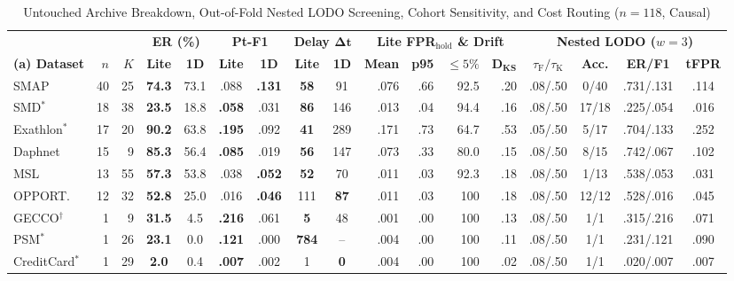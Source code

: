 \begin{table}[t]
\centering
\scriptsize
\setlength{\tabcolsep}{1.0pt}
\renewcommand{\arraystretch}{0.95}
\caption{Untouched Archive Breakdown, Out-of-Fold Nested LODO Screening, Cohort Sensitivity, and Cost Routing ($n{=}118$, Causal)\label{tab:dataset_lodo_audit}}
\begin{tabular*}{\textwidth}{@{\extracolsep{\fill}} l rr cc cc cc rrrr cccc @{}}
\toprule
& & & \multicolumn{2}{c}{\textbf{ER (\%)}} & \multicolumn{2}{c}{\textbf{Pt-F1}} & \multicolumn{2}{c}{\textbf{Delay $\boldsymbol{\Delta t}$}} & \multicolumn{4}{c}{\textbf{Lite FPR$_{\text{hold}}$ \& Drift}} & \multicolumn{4}{c}{\textbf{Nested LODO ($w{=}3$)}} \\
\cmidrule(lr){4-5} \cmidrule(lr){6-7} \cmidrule(lr){8-9} \cmidrule(lr){10-13} \cmidrule(lr){14-17}
\textbf{(a) Dataset} & {$n$} & {$K$} & {\textbf{Lite}} & {\textbf{1D}} & {\textbf{Lite}} & {\textbf{1D}} & {\textbf{Lite}} & {\textbf{1D}} & {\textbf{Mean}} & {\textbf{p95}} & {\textbf{${\le}5\%$}} & {$\boldsymbol{D_{\text{KS}}}$} & {\textbf{$\tau_{\text{F}}/\tau_{\text{K}}$}} & {\textbf{Acc.}} & {\textbf{ER/F1}} & {\textbf{tFPR}} \\
\midrule
SMAP             & 40 & 25 & \textbf{74.3} & 73.1 & .088 & \textbf{.131} & \textbf{58}  & 91  & .076 & .66 & 92.5 & .20 & .08/.50 & 0/40  & .731/.131 & .114 \\
SMD$^*$          & 18 & 38 & \textbf{23.5} & 18.8 & \textbf{.058} & .031 & \textbf{86}  & 146 & .013 & .04 & 94.4 & .16 & .08/.50 & 17/18 & .225/.054 & .016 \\
Exathlon$^*$     & 17 & 20 & \textbf{90.2} & 63.8 & \textbf{.195} & .092 & \textbf{41}  & 289 & .171 & .73 & 64.7 & .53 & .05/.50 & 5/17  & .704/.133 & .252 \\
Daphnet          & 15 & 9  & \textbf{85.3} & 56.4 & \textbf{.085} & .019 & \textbf{56}  & 147 & .073 & .33 & 80.0 & .15 & .08/.50 & 8/15  & .742/.067 & .102 \\
MSL              & 13 & 55 & \textbf{57.3} & 53.8 & .038 & \textbf{.052} & \textbf{52}  & 70  & .011 & .03 & 92.3 & .18 & .08/.50 & 1/13  & .538/.053 & .031 \\
OPPORT.          & 12 & 32 & \textbf{52.8} & 25.0 & .016 & \textbf{.046} & 111 & \textbf{87}  & .011 & .03 & 100  & .18 & .08/.50 & 12/12 & .528/.016 & .045 \\
GECCO$^\dagger$  & 1  & 9  & \textbf{31.5} & 4.5  & \textbf{.216} & .061 & \textbf{5}   & 48  & .001 & .00 & 100  & .13 & .08/.50 & 1/1   & .315/.216 & .071 \\
PSM$^*$          & 1  & 26 & \textbf{23.1} & 0.0  & \textbf{.121} & .000 & \textbf{784} & {--}& .004 & .00 & 100  & .11 & .08/.50 & 1/1   & .231/.121 & .090 \\
CreditCard$^*$   & 1  & 29 & \textbf{2.0}  & 0.4  & \textbf{.007} & .002 & 1   & \textbf{0}   & .004 & .00 & 100  & .02 & .08/.50 & 1/1   & .020/.007 & .007 \\
\bottomrule
\end{tabular*}


\end{table}
